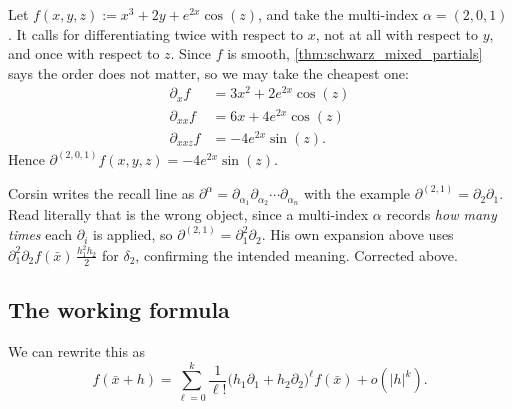 \begin{example}
\label{ex:multi_index_evaluation}
Let $f(x,y,z) := x^3+2y+e^{2x}\cos(z)$, and take the multi-index $\alpha = (2,0,1)$. It calls for
differentiating twice with respect to $x$, not at all with respect to $y$, and once with respect
to $z$. Since $f$ is smooth, \cref{thm:schwarz_mixed_partials} says the order does not matter, so
we may take the cheapest one:
\begin{align*}
\partial_x f &= 3x^2 + 2e^{2x}\cos(z) \\
\partial_{xx} f &= 6x + 4e^{2x}\cos(z) \\
\partial_{xxz} f &= -4e^{2x}\sin(z).
\end{align*}
Hence $\partial^{(2,0,1)} f(x,y,z) = -4e^{2x}\sin(z)$.
\end{example}

\begin{ainote}
Corsin writes the recall line as
$\partial^\alpha = \partial_{\alpha_1}\partial_{\alpha_2}\cdots\partial_{\alpha_n}$ with the
example $\partial^{(2,1)} = \partial_2\partial_1$. Read literally that is the wrong object, since
a multi-index $\alpha$ records \textit{how many times} each $\partial_i$ is applied, so
$\partial^{(2,1)} = \partial_1^2\partial_2$. His own expansion above uses
$\partial_1^2\partial_2 f(\bar x)\,\tfrac{h_1^2h_2}{2}$ for $\delta_2$, confirming the intended
meaning. Corrected above.
\end{ainote}

\subsection{The working formula}

We can rewrite this as
\[f(\bar x + h) = \sum_{\ell=0}^{k}\frac{1}{\ell!}\big(h_1\partial_1 + h_2\partial_2\big)^\ell f(\bar x) + o(|h|^k).\]


